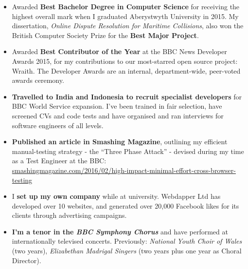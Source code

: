 \begin{itemize}
    \setlength\itemsep{0.3em}

    \item Awarded \textbf{Best Bachelor Degree in Computer Science}  for receiving the highest overall mark when I graduated Aberystwyth University in 2015. My dissertation, \emph{Online Dispute Resolution for Maritime Collisions}, also won the British Computer Society Prize for the \textbf{Best Major Project}.

    \item Awarded \textbf{Best Contributor of the Year} at the BBC News Developer Awards 2015, for my contributions to our most-starred open source project: Wraith. The Developer Awards are an internal, department-wide, peer-voted awards ceremony.

    \item \textbf{Travelled to India and Indonesia to recruit specialist developers} for BBC World Service expansion. I've been trained in fair selection, have screened CVs and code tests and have organised and ran interviews for  software engineers of all levels.

    \item \textbf{Published an article in  Smashing Magazine}, outlining my efficient manual-testing strategy - the ``Three Phase Attack'' - devised during my time as a Test Engineer at the BBC:
    \\\url{smashingmagazine.com/2016/02/high-impact-minimal-effort-cross-browser-testing}

    \item I \textbf{set up my own company} while at university. Webdapper Ltd has developed over 10 websites, and generated over 20,000 Facebook likes for its clients through advertising campaigns.
    
    \item \textbf{I'm a tenor in the \emph{BBC Symphony Chorus}} and have performed at internationally televised concerts. Previously: \emph{National Youth Choir of Wales} (two years), \emph{Elizabethan Madrigal Singers} (two years plus one year as Choral Director).

\end{itemize}
